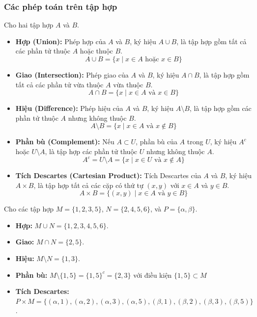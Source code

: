 \subsubsection{Các phép toán trên tập hợp}
\begin{definition}
    Cho hai tập hợp $A$ và $B$.
    \begin{itemize}
        \item \textbf{Hợp (Union):} Phép hợp của $A$ và $B$, ký hiệu $A \cup B$, là tập hợp gồm tất cả các phần tử thuộc $A$ hoặc thuộc $B$.
        \[ A \cup B = \{x \mid x \in A \text{ hoặc } x \in B\} \]
        
        \item \textbf{Giao (Intersection):} Phép giao của $A$ và $B$, ký hiệu $A \cap B$, là tập hợp gồm tất cả các phần tử vừa thuộc $A$ vừa thuộc $B$.
        \[ A \cap B = \{x \mid x \in A \text{ và } x \in B\} \]
        
        \item \textbf{Hiệu (Difference):} Phép hiệu của $A$ và $B$, ký hiệu $A \setminus B$, là tập hợp gồm các phần tử thuộc $A$ nhưng không thuộc $B$.
        \[ A \setminus B = \{x \mid x \in A \text{ và } x \notin B\} \]
        
        \item \textbf{Phần bù (Complement):} Nếu $A \subset U$, phần bù của $A$ trong $U$, ký hiệu $A^c$ hoặc $U \setminus A$, là tập hợp các phần tử thuộc $U$ nhưng không thuộc $A$.
        \[A^c = U \setminus A = \{x \mid x \in U \text{ và } x \notin A\}\]
        
        \item \textbf{Tích Descartes (Cartesian Product):} Tích Descartes của $A$ và $B$, ký hiệu $A \times B$, là tập hợp tất cả các cặp có thứ tự $(x, y)$ với $x \in A$ và $y \in B$.
        \[ A \times B = \{(x, y) \mid x \in A \text{ và } y \in B\} \]
    \end{itemize}
\end{definition}

\begin{example}
    Cho các tập hợp $M = \{1, 2, 3, 5\}$, $N = \{2, 4, 5, 6\}$, và $P = \{\alpha, \beta\}$.
    \begin{itemize}
        \item \textbf{Hợp:} $M \cup N = \{1, 2, 3, 4, 5, 6\}$.
        \item \textbf{Giao:} $M \cap N = \{2, 5\}$.
        \item \textbf{Hiệu:} $M \setminus N = \{1, 3\}$.
        \item \textbf{Phần bù:} $M \setminus \{1, 5\} = \{1, 5\}^c = \{2, 3\}$ với điều kiện $\{1, 5\} \subset M$
        \item \textbf{Tích Descartes:} $P \times M = \{(\alpha, 1), (\alpha, 2), (\alpha, 3), (\alpha, 5), (\beta, 1), (\beta, 2), (\beta, 3), (\beta, 5)\}$.
    \end{itemize}
\end{example}


